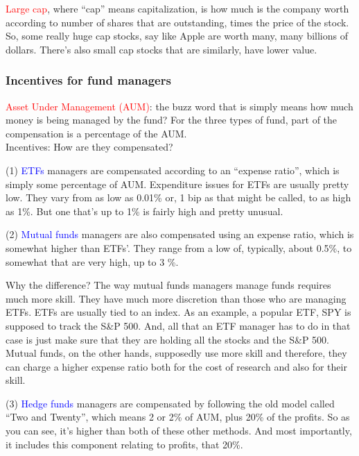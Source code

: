 \documentclass[12pt]{article}
\newcommand{\q}[1]{``#1''}
\begin{document}
\noindent
\textcolor{red}{Large cap}, where \q{cap} means capitalization, is how much is the company worth according to number of shares that are outstanding, times the price of the stock. So, some really huge cap stocks, say like Apple are worth many, many billions of dollars. There's also small cap stocks that are similarly, have lower value. 

\subsubsection{Incentives for fund managers}

\noindent
\textcolor{red}{Asset Under Management (AUM)}: the buzz word that is simply means how much money is being managed by the fund? For the three types of fund, part of the compensation is a percentage of the AUM. \\[5pt]
\noindent
Incentives: How are they compensated?
 
\noindent
(1) \textcolor{blue}{ETFs} managers are compensated according to an \q{expense ratio}, which is simply some percentage of AUM. Expenditure issues for ETFs are usually pretty low. They vary from as low as 0.01\% or, 1 bip as that might be called, to as high as 1\%. But one that's up to 1\% is fairly high and pretty unusual. 

\noindent
(2) \textcolor{blue}{Mutual funds} managers are also compensated using an expense ratio, which is somewhat higher than ETFs'. They range from a low of, typically, about 0.5\%, to somewhat that are very high, up to 3 \%. 

Why the difference? The way mutual funds managers manage funds requires much more skill. They have much more discretion than those who are managing ETFs. ETFs are usually tied to an index. As an example, a popular ETF, SPY is supposed to track the S\&P 500. And, all that an ETF manager has to do in that case is just make sure that they are holding all the stocks and the S\&P 500. Mutual funds, on the other hands, supposedly use more skill and therefore, they can charge a higher expense ratio both for the cost of research and also for their skill. 

\noindent
(3) \textcolor{blue}{Hedge funds} managers are compensated by following the old model called \q{Two and Twenty}, which means 2 or 2\% of AUM, plus 20\% of the profits. So as you can see, it's higher than both of these other methods. And most importantly, it includes this component relating to profits, that 20\%. 
\end{document}
